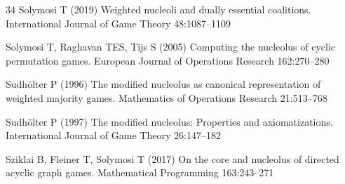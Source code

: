 \documentclass[a4paper,12pt]{article}
\theoremstyle{definition}
\theoremstyle{remark}
\begin{document}
\begin{thebibliography}{34}
Solymosi T (2019) Weighted nucleoli and dually essential coalitions.
  International Journal of Game Theory 48:1087--1109

Solymosi T, Raghavan TES, Tijs S (2005) Computing the nucleolus of cyclic
  permutation games. European Journal of Operations Research 162:270--280

Sudhölter P (1996) The modified nucleolus as canonical representation of
  weighted majority games. Mathematics of Operations Research 21:513--768

Sudhölter P (1997) The modified nucleolus: Properties and axiomatizations.
  International Journal of Game Theory 26:147–182

Sziklai B, Fleiner T, Solymosi T (2017) On the core and nucleolus of directed
  acyclic graph games. Mathematical Programming 163:243–271

\end{thebibliography}
\end{document}
